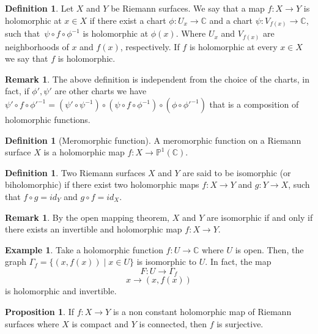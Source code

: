 \documentclass[12pt,a4paper,openright,twoside]{report}
\theoremstyle{definition} %
\newtheorem{proposition}[theorem]{Proposition}
\newtheorem{definition}[theorem]{Definition}
\newtheorem{remark}[theorem]{Remark}
\newtheorem{example}[theorem]{Example}
\def \C {\mathbb{C}}
\def \PP {\mathbb{P}^1(\C)}
\begin{document}
\begin{definition}
    Let \(X\) and \(Y\) be Riemann surfaces. We say that a map \(f:X \to Y\) is holomorphic at \(x \in X\) if
    there exist a chart \( \phi : U_x \to \C\) and a chart \( \psi : V_{f(x)} \to \C\), such that \(\,\psi \circ f \circ \phi^{-1}\) is holomorphic at \(\phi(x)\). Where \(U_x\) and
    \(V_{f(x)}\) are neighborhoods of \(x\) and \(f(x)\), respectively.
    If \(f\) is holomorphic at every \(x \in X\) we say that \(f\) is holomorphic.
\end{definition}

\begin{remark}
    The above definition is independent from the choice of the charts, in fact, if \(\phi' , \psi'\) are other charts we have \(\psi' \circ f \circ \phi'^{-1} = (\psi' \circ \psi^{-1}) \circ (\psi \circ f \circ \phi^{-1}) \circ (\phi \circ \phi'^{-1})\) that is a composition of holomorphic functions.
\end{remark}

\begin{definition}[Meromorphic function]
    A meromorphic function on a Riemann surface \(X\) is a holomorphic map \(f: X \to \PP\).
\end{definition}

\begin{definition}
    Two Riemann surfaces \(X\) and \(Y\) are said to be isomorphic (or biholomorphic) if there exist two holomorphic maps \(f : X \to Y\) and \(g : Y \to X\), such that \(f \circ g = id_Y\) and \(g \circ f = id_X\).
\end{definition}

\begin{remark}\label{rem:Isomorfe}
    By the open mapping theorem, \(X\) and \(Y\) are isomorphic if and only if there exists an invertible and holomorphic map \(f : X \to Y\).
\end{remark}

\begin{example}
    Take a holomorphic function \(f:U \to \C\) where \(U\) is open. Then, the graph \(\Gamma_f = \{ (x,f(x)) \; | \; x \in U \} \) is isomorphic to \(U\). In fact, the map
    \[
    F : U \to \Gamma_f
    \]
    \[
    x \to (x,f(x))
    \]
    is holomorphic and invertible.
\end{example}

\begin{proposition}\label{prop:CompattaSuriettiva}
    If \(f:X \to Y\) is a non constant holomorphic map of Riemann surfaces where \(X\) is compact and \(Y\) is connected, then \(f\) is surjective.
\end{proposition}
\end{document}
